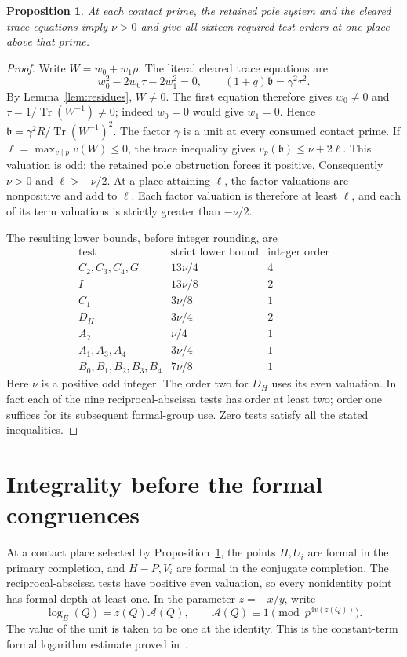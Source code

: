 \documentclass[11pt,a4paper]{article}
\newtheorem{proposition}[theorem]{Proposition}
\DeclareMathOperator{\Tr}{Tr}\DeclareMathOperator{\Nm}{Nm}
\begin{document}
\begin{proposition}\label{prop:extract}
At each contact prime, the retained pole system and the cleared trace
equations imply $\nu>0$ and give all sixteen required test orders at
one place above that prime.
\end{proposition}
\begin{proof}
Write $W=w_0+w_1\rho$. The literal cleared trace equations are
\[
 w_0^2-2w_0\tau-2w_1^2=0,\qquad (1+q)\mathfrak b=\gamma^2\tau^2.
\]
By Lemma~\ref{lem:residues}, $W\ne0$. The first equation therefore
gives $w_0\ne0$ and $\tau=1/\Tr(W^{-1})\ne0$; indeed $w_0=0$
would give $w_1=0$. Hence
$\mathfrak b=\gamma^2R/\Tr(W^{-1})^2$. The factor $\gamma$ is a unit at every consumed contact prime. If
$\ell=\max_{v\mid p}v(W)\le0$, the trace inequality gives
$v_p(\mathfrak b)\le\nu+2\ell$.
This valuation is odd; the retained pole obstruction forces it positive.
Consequently $\nu>0$ and $\ell>-\nu/2$.
At a place attaining $\ell$, the factor valuations are nonpositive
and add to $\ell$. Each factor valuation is therefore at least $\ell$,
and each of its term valuations is strictly greater than $-\nu/2$.

The resulting lower bounds, before integer rounding, are
\[
\begin{array}{c|c|c}
\text{test}&\text{strict lower bound}&\text{integer order}\\\hline
C_2,C_3,C_4,G&13\nu/4&4\\
I&13\nu/8&2\\
C_1&3\nu/8&1\\
D_H&3\nu/4&2\\
A_2&\nu/4&1\\
A_1,A_3,A_4&3\nu/4&1\\
B_0,B_1,B_2,B_3,B_4&7\nu/8&1
\end{array}
\]
Here $\nu$ is a positive odd integer. The order two for $D_H$ uses
its even valuation. In fact each of the nine reciprocal-abscissa
tests has order at least two; order one suffices for its subsequent
formal-group use. Zero tests satisfy all the stated inequalities.
\end{proof}

\section{Integrality before the formal congruences}
At a contact place selected by Proposition~\ref{prop:extract}, the
points $H,U_i$ are formal in the primary completion, and $H-P,V_i$
are formal in the conjugate completion. The reciprocal-abscissa
tests have positive even valuation, so every nonidentity point has
formal depth at least one. In the parameter $z=-x/y$, write
\[
 \log_E(Q)=z(Q)\mathcal A(Q),\qquad
 \mathcal A(Q)\equiv1\pmod{p^{4v(z(Q))}}.
\]
The value of the unit is taken to be one at the identity. This is
the constant-term formal logarithm estimate proved in~\cite{Logs}.
\end{document}
